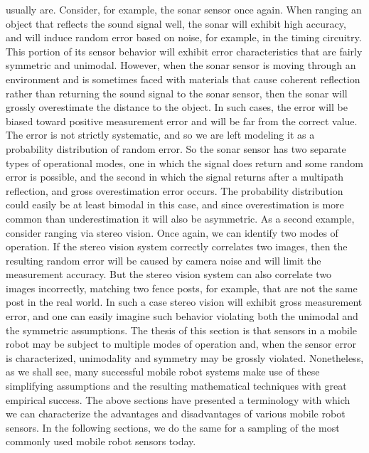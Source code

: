 usually are.
Consider, for example, the sonar sensor once again. When ranging an object that reflects
the sound signal well, the sonar will exhibit high accuracy, and will induce random error
based on noise, for example, in the timing circuitry. This portion of its sensor behavior will
exhibit error characteristics that are fairly symmetric and unimodal. However, when the
sonar sensor is moving through an environment and is sometimes faced with materials that
cause coherent reflection rather than returning the sound signal to the sonar sensor, then the
sonar will grossly overestimate the distance to the object. In such cases, the error will be
biased toward positive measurement error and will be far from the correct value. The error
is not strictly systematic, and so we are left modeling it as a probability distribution of
random error. So the sonar sensor has two separate types of operational modes, one in
which the signal does return and some random error is possible, and the second in which
the signal returns after a multipath reflection, and gross overestimation error occurs. The
probability distribution could easily be at least bimodal in this case, and since overestimation 
is more common than underestimation it will also be asymmetric.
As a second example, consider ranging via stereo vision. Once again, we can identify
two modes of operation. If the stereo vision system correctly correlates two images, then
the resulting random error will be caused by camera noise and will limit the measurement
accuracy. But the stereo vision system can also correlate two images incorrectly, matching
two fence posts, for example, that are not the same post in the real world. In such a case
stereo vision will exhibit gross measurement error, and one can easily imagine such behavior 
violating both the unimodal and the symmetric assumptions.
The thesis of this section is that sensors in a mobile robot may be subject to multiple
modes of operation and, when the sensor error is characterized, unimodality and symmetry
may be grossly violated. Nonetheless, as we shall see, many successful mobile robot systems 
make use of these simplifying assumptions and the resulting mathematical techniques
with great empirical success.
The above sections have presented a terminology with which we can characterize the
advantages and disadvantages of various mobile robot sensors. In the following sections,
we do the same for a sampling of the most commonly used mobile robot sensors today.

